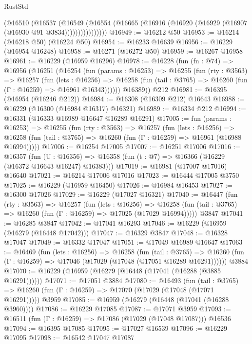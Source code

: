 \begin{lexlean}{RustStd}
\begin{coremodule}
                (@16510
                  (@16537
                    (@16549
                      (@16554
                        (@16665 (@16916 (@16920 (@16929 (@16907 (@16930 @91 @3834))))))))))))))))
@16949 := @16212 @50
@16953 := @16214 (@16218 @50) (@16224 @50)
@16954 := @16233 @16639
@16956 := @16229 (@16954 @16248)
@16958 := @16271 (@16272 @50)
@16959 := @16267 @16958
@16961 := @16229 (@16959 @16296)
@16978 := @16228
    (fun (fn : @74) =>
    @16956
      (@16251
        (@16254
          (fun (params : @16253) =>
          @16255
            (fun (rty : @3563) =>
            @16257
              (fun (lets : @16256) =>
              @16258 (fun (tail : @3765) => @16260 (fun (Γ : @16259) => @16961 @16343))))))
        @16389))
    @212
@16981 := @16395 (@16954 (@16246 @212))
@16984 := @16308 (@16309 @212) @16643
@16988 := @16229 (@16300 (@16984 @16317) @16321)
@16989 := @16334 @212
@16994 := @16331 (@16333 @16989 @16647 @16289 @16291)
@17005 := fun (params : @16253) =>
  @16255
    (fun (rty : @3563) =>
    @16257
      (fun (lets : @16256) =>
      @16258 (fun (tail : @3765) => @16260 (fun (Γ : @16259) => @16961 (@16988 @16994)))))
@17006 := @16254 @17005
@17007 := @16251 @17006
@17016 := @16357
    (fun (U : @16356) => @16358 (fun (t : @7) => @16366 (@16229 (@16372 @16643 @16247) @16383)))
@17019 := @16981 (@17007 @17016) @16640
@17021 := @16214 @17006 @17016
@17023 := @16444 @17005 @3750
@17025 := @16229 (@16959 @16450)
@17026 := @16984 @16453
@17027 := @16300 @17026
@17029 := @16229 (@17027 @16321)
@17040 := @16447
    (fun (rty : @3563) =>
    @16257
      (fun (lets : @16256) =>
      @16258 (fun (tail : @3765) => @16260 (fun (Γ : @16259) => @17025 (@17029 @16994)))))
    @3847
@17041 := @16285 @3847
@17042 := @17041 @16293
@17046 := @16229 (@16959 (@16279 (@16448 @17042)))
@17047 := @16329 @3847
@17048 := @16328 @17047
@17049 := @16332 @17047
@17051 := @17049 @16989 @16647
@17063 := @16469
    (fun (lets : @16256) =>
    @16258
      (fun (tail : @3765) =>
      @16260 (fun (Γ : @16259) => @17046 (@17029 (@17048 (@17051 @16289 @16291))))))
    @3884
@17070 := @16229 (@16959 (@16279 (@16448 (@17041 (@16288 (@3885 @16291))))))
@17071 := @17051 @3884
@17080 := @16493
    (fun (tail : @3765) => @16260 (fun (Γ : @16259) => @17070 (@17029 (@17048 (@17071 @16291)))))
    @3959
@17085 := @16959 (@16279 (@16448 (@17041 (@16288 @3960))))
@17086 := @16229 @17085
@17087 := @17071 @3959
@17093 := @16511 (fun (Γ : @16259) => @17086 (@17029 (@17048 @17087))) @16536
@17094 := @16395 @17085
@17095 := @17027 @16539
@17096 := @16229 @17095
@17098 := @16542 @17047 @17087

\end{coremodule}
\end{lexlean}
